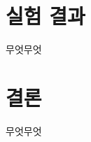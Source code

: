 \documentclass[a4paper, 10pt, nanum]{CSUniSchoolLabReport}
\begin{document}
\section{실험 결과}

	무엇무엇



\section{결론}

	무엇무엇



\end{document}
